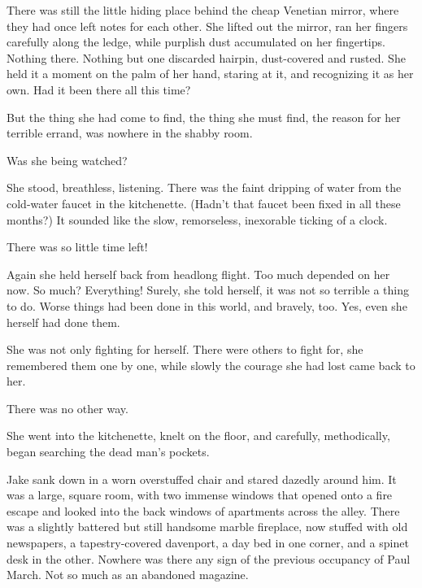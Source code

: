 \documentclass{novel}
\begin{document}
There was still the little hiding place behind the cheap Venetian mirror, where they had once left notes for each other. She lifted out the mirror, ran her fingers carefully along the ledge, while purplish dust accumulated on her fingertips. Nothing there. Nothing but one discarded hairpin, dust-covered and rusted. She held it a moment on the palm of her hand, staring at it, and recognizing it as her own. Had it been there all this time?

But the thing she had come to find, the thing she must find, the reason for her terrible errand, was nowhere in the shabby room.

Was she being watched?

She stood, breathless, listening. There was the faint dripping of water from the cold-water faucet in the kitchenette. (Hadn’t that faucet been fixed in all these months?) It sounded like the slow, remorseless, inexorable ticking of a clock.

There was so little time left!

Again she held herself back from headlong flight. Too much depended on her now. So much? Everything! Surely, she told herself, it was not so terrible a thing to do. Worse things had been done in this world, and bravely, too. Yes, even she herself had done them.

She was not only fighting for herself. There were others to fight for, she remembered them one by one, while slowly the courage she had lost came back to her.

There was no other way.

She went into the kitchenette, knelt on the floor, and carefully, methodically, began searching the dead man’s pockets.

\begin{ChapterStart}
\vspace{3\nbs}
\end{ChapterStart}

Jake sank down in a worn overstuffed chair and stared dazedly around him. It was a large, square room, with two immense windows that opened onto a fire escape and looked into the back windows of apartments across the alley. There was a slightly battered but still handsome marble fireplace, now stuffed with old newspapers, a tapestry-covered davenport, a day bed in one corner, and a spinet desk in the other. Nowhere was there any sign of the previous occupancy of Paul March. Not so much as an abandoned magazine.
\end{document}
